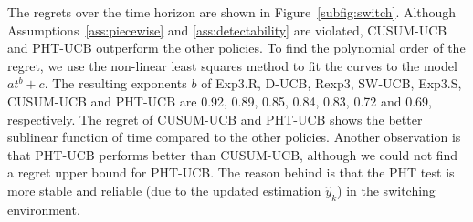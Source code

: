 \documentclass[letterpaper]{article}
\newcommand{\blue}{}
\begin{document}
The regrets over the time horizon are shown in
Figure~\ref{subfig:switch}.  Although
Assumptions~\ref{ass:piecewise} and \ref{ass:detectability} are violated, CUSUM-UCB and PHT-UCB outperform the other policies.
{\blue To find the polynomial order of the regret,
we use the non-linear least squares method to fit the curves to the
model $at^b+c$. The
resulting exponents $b$ of Exp3.R, D-UCB, Rexp3, SW-UCB, Exp3.S, CUSUM-UCB and PHT-UCB are
0.92, 0.89, 0.85, 0.84, 0.83, 0.72 and 0.69, respectively.}
The regret of CUSUM-UCB and PHT-UCB shows the better sublinear
function of time compared to the other policies. Another
observation is that PHT-UCB performs better than CUSUM-UCB,
{\blue although we could not find a regret upper bound for
PHT-UCB}. The reason behind is that the PHT test is more stable and
reliable (due to the updated estimation $\hat{y}_k$) in the switching
environment.
\end{document}

